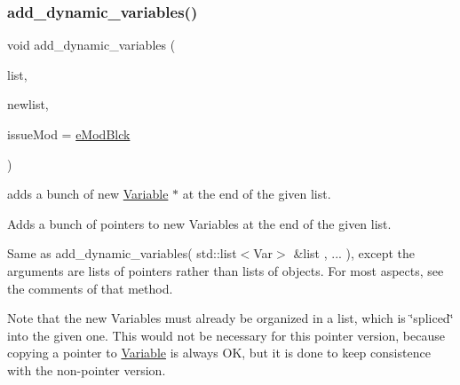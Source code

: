 \subsubsection{\texorpdfstring{add\+\_\+dynamic\+\_\+variables()}{add\_dynamic\_variables()}\hspace{0.1cm}{\footnotesize\ttfamily [2/2]}}
{\footnotesize\ttfamily void add\+\_\+dynamic\+\_\+variables (\begin{DoxyParamCaption}\item[{std\+::list$<$ Var $\ast$$>$ \&}]{list,  }\item[{std\+::list$<$ Var $\ast$$>$ \&}]{newlist,  }\item[{\mbox{\hyperlink{group___modification___t_y_p_e_s_ga544246d8c462e9a2d817c2c30797968f}{c\+\_\+\+Mod\+Param}}}]{issue\+Mod = {\ttfamily \mbox{\hyperlink{group___modification___t_y_p_e_s_gga48fddcdd03a03f49b7e389ca1ed938d4a21b14b26b1c0093a0905f6fc010bad29}{e\+Mod\+Blck}}} }\end{DoxyParamCaption})}



adds a bunch of new \mbox{\hyperlink{class_s_m_spp__di__unipi__it_1_1_variable}{Variable}} $\ast$ at the end of the given list. 

Adds a bunch of pointers to new Variables at the end of the given list.

Same as add\+\_\+dynamic\+\_\+variables( std\+::list$<$\+Var$>$ \&list , ... ), except the arguments are lists of pointers rather than lists of objects. For most aspects, see the comments of that method.

Note that the new Variables must already be organized in a list, which is \char`\"{}spliced\char`\"{} into the given one. This would not be necessary for this pointer version, because copying a pointer to \mbox{\hyperlink{class_s_m_spp__di__unipi__it_1_1_variable}{Variable}} is always OK, but it is done to keep consistence with the non-\/pointer version. \mbox{\label{class_s_m_spp__di__unipi__it_1_1_block_a9b94536a10555dfb680e015fcb4787a8}} 
